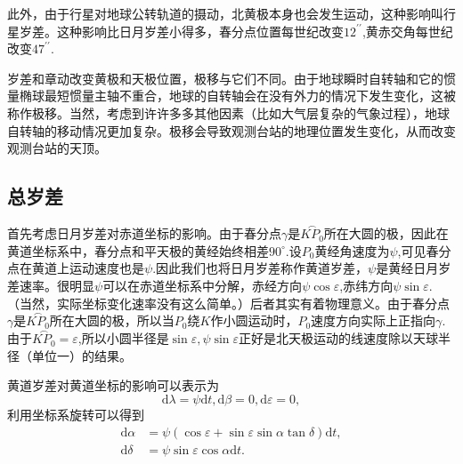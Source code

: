 \documentclass[11pt, a4paper, oneside]{ctexart}
\numberwithin{equation}{subsection}
\begin{document}
此外，由于行星对地球公转轨道的摄动，北黄极本身也会发生运动，这种影响叫行星岁差。这种影响比日月岁差小得多，春分点位置每世纪改变$12^{\prime\prime}$,黄赤交角每世纪改变$47^{\prime\prime}$.

岁差和章动改变黄极和天极位置，极移与它们不同。由于地球瞬时自转轴和它的惯量椭球最短惯量主轴不重合，地球的自转轴会在没有外力的情况下发生变化，这被称作极移。当然，考虑到许许多多其他因素（比如大气层复杂的气象过程），地球自转轴的移动情况更加复杂。极移会导致观测台站的地理位置发生变化，从而改变观测台站的天顶。

\subsection{总岁差}
首先考虑日月岁差对赤道坐标的影响。由于春分点$\gamma$是$\overset{\frown}{KP_{0}}$所在大圆的极，因此在黄道坐标系中，春分点和平天极的黄经始终相差$90^{\circ}$.设$P_{0}$黄经角速度为$\psi$,可见春分点在黄道上运动速度也是$\psi$.因此我们也将日月岁差称作黄道岁差，$\psi$是黄经日月岁差速率。很明显$\psi$可以在赤道坐标系中分解，赤经方向$\psi\cos\varepsilon$,赤纬方向$\psi\sin\varepsilon$.（当然，实际坐标变化速率没有这么简单。）后者其实有着物理意义。由于春分点$\gamma$是$\overset{\frown}{KP_{0}}$所在大圆的极，所以当$P_{0}$绕$K$作小圆运动时，$P_{0}$速度方向实际上正指向$\gamma$.由于$\overset{\frown}{KP_{0}}=\varepsilon$,所以小圆半径是$\sin\varepsilon,\psi\sin\varepsilon$正好是北天极运动的线速度除以天球半径（单位一）的结果。

黄道岁差对黄道坐标的影响可以表示为
\begin{equation}
\mathrm{d}\lambda=\psi\mathrm{d}t,\mathrm{d}\beta=0,\mathrm{d}\varepsilon=0,
\end{equation}
利用坐标系旋转可以得到
\begin{align}
\mathrm{d}\alpha&=\psi\left(\cos\varepsilon+\sin\varepsilon\sin\alpha\tan\delta{}\right)\mathrm{d}t,\\
\mathrm{d}\delta{}&=\psi\sin\varepsilon\cos\alpha\mathrm{d}t.
\end{align}
\end{document}
